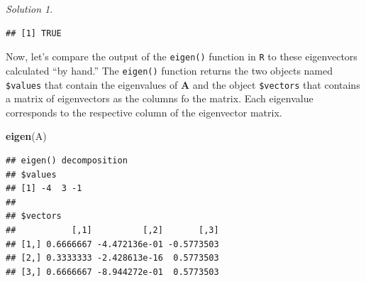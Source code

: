 \documentclass[
]{book}
\newenvironment{Shaded}{\begin{snugshade}}{\end{snugshade}}
\newcommand{\CommentTok}[1]{\textcolor[rgb]{0.56,0.35,0.01}{\textit{#1}}}
\newcommand{\DecValTok}[1]{\textcolor[rgb]{0.00,0.00,0.81}{#1}}
\newcommand{\KeywordTok}[1]{\textcolor[rgb]{0.13,0.29,0.53}{\textbf{#1}}}
\newcommand{\NormalTok}[1]{#1}
\newcommand{\OperatorTok}[1]{\textcolor[rgb]{0.81,0.36,0.00}{\textbf{#1}}}
\newcommand{\StringTok}[1]{\textcolor[rgb]{0.31,0.60,0.02}{#1}}
\theoremstyle{definition}
\theoremstyle{definition}
\theoremstyle{definition}
\theoremstyle{definition}
\theoremstyle{remark}
\newtheorem*{solution}{Solution}
\begin{document}
\begin{solution}
\begin{Shaded}
\end{Shaded}

\begin{verbatim}
## [1] TRUE
\end{verbatim}

Now, let's compare the output of the \texttt{eigen()} function in \texttt{R} to these eigenvectors calculated ``by hand.'' The \texttt{eigen()} function returns the two objects named \texttt{\$values} that contain the eigenvalues of \(\mathbf{A}\) and the object \texttt{\$vectors} that contains a matrix of eigenvectors as the columns fo the matrix. Each eigenvalue corresponds to the respective column of the eigenvector matrix.

\begin{Shaded}
\begin{Highlighting}[]
\KeywordTok{eigen}\NormalTok{(A)}
\end{Highlighting}
\end{Shaded}

\begin{verbatim}
## eigen() decomposition
## $values
## [1] -4  3 -1
## 
## $vectors
##           [,1]          [,2]       [,3]
## [1,] 0.6666667 -4.472136e-01 -0.5773503
## [2,] 0.3333333 -2.428613e-16  0.5773503
## [3,] 0.6666667 -8.944272e-01  0.5773503
\end{verbatim}


\end{solution}
\end{document}
